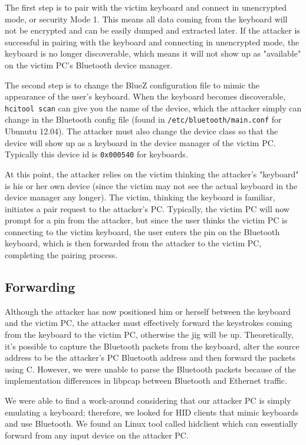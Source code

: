 \documentclass{acm_proc_article-sp}
\begin{document}
The first step is to pair with the victim keyboard and connect in unencrypted mode, or security Mode 1. This means all data coming from the keyboard will not be encrypted and can be easily dumped and extracted later. If the attacker is successful in pairing with the keyboard and connecting in unencrypted mode, the keyboard is no longer discoverable, which means it will not show up as "available" on the victim PC's Bluetooth device manager. 

The second step is to change the BlueZ configuration file to mimic the appearance of the user's keyboard. When the keyboard becomes discoverable, \texttt{hcitool scan} can give you the name of the device, which the attacker simply can change in the Bluetooth config file (found in \texttt{/etc/bluetooth/main.conf} for Ubunutu 12.04). The attacker must also change the device class so that the device will show up as a keyboard in the device manager of the victim PC. Typically this device id is \texttt{0x000540} for keyboards. 

At this point, the attacker relies on the victim thinking the attacker's "keyboard" is his or her own device (since the victim may not see the actual keyboard in the device manager any longer). The victim, thinking the keyboard is familiar, initiates a pair request to the attacker's PC. Typically, the victim PC will now prompt for a pin from the attacker, but since the user thinks the victim PC is connecting to the victim keyboard, the user enters the pin on the Bluetooth keyboard, which is then forwarded from the attacker to the victim PC, completing the pairing process. 

\subsection{Forwarding}
Although the attacker has now positioned him or herself between the keyboard and the victim PC, the attacker must effectively forward the keystrokes coming from the keyboard to the victim PC, otherwise the jig will be up.   
Theoretically, it's possible to capture the Bluetooth packets from the keyboard, alter the source address to be the attacker's PC Bluetooth address and then forward the packets using C. However, we were unable to parse the Bluetooth packets because of the implementation differences in libpcap between Bluetooth and Ethernet traffic. 

We were able to find a work-around considering that our attacker PC is simply emulating a keyboard; therefore, we looked for HID clients that mimic keyboards and use Bluetooth. We found an Linux tool called hidclient \cite{hidclient} which can essentially forward from any input device on the attacker PC. 
\end{document}
